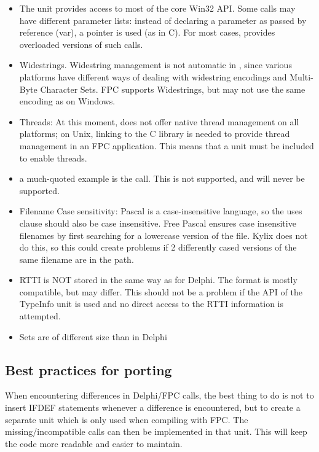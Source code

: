 \begin{itemize}
\item The  unit provides access to most of the core 
Win32 API. Some calls may have different parameter lists: instead 
of declaring a parameter as passed by reference (var), a pointer 
is used (as in C). For most cases, \fpc provides overloaded versions 
of such calls.
\item Widestrings. Widestring management is not automatic in \fpc, since various platforms have different ways of dealing with widestring encodings and Multi-Byte Character Sets. FPC supports Widestrings, but may not use the same encoding as on Windows.
\item Threads: At this moment, \fpc does not offer native thread 
management on all platforms; on Unix, linking to the C library is 
needed to provide thread management in an FPC application. 
This means that a  unit must be included to enable 
threads.
\item a much-quoted example is the  call. 
This is not supported, and will never be supported.
\item Filename Case sensitivity: Pascal is a case-insensitive language,
so the uses clause should also be case insensitive. Free Pascal ensures
case insensitive filenames by first searching for a lowercase version 
of the file. Kylix does not do this, so this could create problems
if 2 differently cased versions of the same filename are in the path.
\item RTTI is NOT stored in the same way as for Delphi. The format is mostly compatible, but may differ. This should not be a problem if the API of the TypeInfo unit 
is used and no direct access to the RTTI information is attempted.
\item Sets are of different size than in Delphi
\end{itemize}

\subsection{Best practices for porting}

When encountering differences in Delphi/FPC calls, the best thing to 
do is not to insert IFDEF statements whenever a difference is 
encountered, but to create a separate unit which is only used 
when compiling with FPC. The missing/incompatible calls can 
then be implemented in that unit. This will keep the code more 
readable and easier to maintain.

